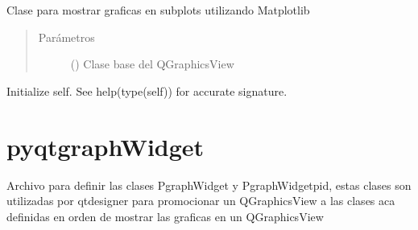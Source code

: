 \documentclass[letterpaper,10pt,spanish]{sphinxmanual}
\begin{document}
\begin{fulllineitems}
\label{\detokenize{codigos/Promociones:mlpwidget.MlpWidgetSubplot}}
Clase para mostrar graficas en subplots utilizando Matplotlib
\begin{quote}\begin{description}
\item[{Parámetros}] \leavevmode
{} () \textendash{} Clase base del QGraphicsView

\end{description}\end{quote}

\begin{fulllineitems}
\label{\detokenize{codigos/Promociones:mlpwidget.MlpWidgetSubplot.__init__}}
Initialize self.  See help(type(self)) for accurate signature.

\end{fulllineitems}


\end{fulllineitems}



\section{pyqtgraphWidget}
\label{\detokenize{codigos/Promociones:module-pyqtgraphWidget}}\label{\detokenize{codigos/Promociones:pyqtgraphwidget}}
Archivo para definir las clases PgraphWidget y PgraphWidgetpid, estas clases son utilizadas por qtdesigner para promocionar un QGraphicsView a las clases aca definidas en orden de mostrar las graficas en un QGraphicsView
\end{document}
